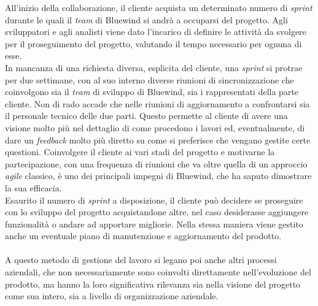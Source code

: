 \noindent
All'inizio della collaborazione, il cliente acquista un determinato numero di \textit{sprint} durante le quali il \textit{team} di Bluewind si andrà a occuparsi del progetto.
Agli sviluppatori e agli analisti viene dato l'incarico di definire le attività da svolgere per il proseguimento del progetto, valutando il tempo necessario per ognuna di esse.\\
In mancanza di una richiesta diversa, esplicita del cliente, una \textit{sprint} si protrae per due settimane, con al suo interno diverse riunioni di sincronizzazione che coinvolgono sia il \textit{team} di sviluppo di Bluewind, sia i rappresentati della parte cliente.
Non di rado accade che nelle riunioni di aggiornamento a confrontarsi sia il personale tecnico delle due parti.
Questo permette al cliente di avere una visione molto più nel dettaglio di come procedono i lavori ed, eventualmente, di dare un \textit{feedback} molto più diretto su come si preferisce che vengano gestite certe questioni.
Coinvolgere il cliente ai vari stadi del progetto e motivarne la partecipazione, con una frequenza di riunioni che va oltre quella di un approccio \textit{agile} classico, è uno dei principali impegni di Bluewind, che ha saputo dimostrare la sua efficacia.\\
Esaurito il numero di \textit{sprint} a disposizione, il cliente può decidere se proseguire con lo sviluppo del progetto acquistandone altre, nel caso desiderasse aggiungere funzionalità o andare ad apportare migliorie.
Nella stessa maniera viene gestito anche un eventuale piano di manutenzione e aggiornamento del prodotto.\\\\
A questo metodo di gestione del lavoro si legano poi anche altri processi aziendali, che non necessariamente sono coinvolti direttamente nell'evoluzione del prodotto, ma hanno la loro significativa rilevanza sia nella visione del progetto come sua intero, sia a livello di organizzazione aziendale.

